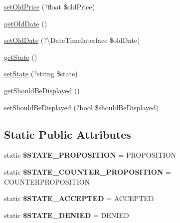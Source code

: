 \begin{DoxyCompactItemize}
\item 
\mbox{\hyperlink{class_app_1_1_entity_1_1_proposition_a6d13c98cd930f18428bd23fdd7ed0830}{set\+Old\+Price}} (?float \$old\+Price)
\item 
\mbox{\hyperlink{class_app_1_1_entity_1_1_proposition_ac7965e177345d55c4a73d4fc25014209}{get\+Old\+Date}} ()
\item 
\mbox{\hyperlink{class_app_1_1_entity_1_1_proposition_ac9048be57b5a9e5419ff789ebc2d9137}{set\+Old\+Date}} (?\textbackslash{}Date\+Time\+Interface \$old\+Date)
\item 
\mbox{\hyperlink{class_app_1_1_entity_1_1_proposition_afbf787ced76807989fb3093e1772c5a1}{get\+State}} ()
\item 
\mbox{\hyperlink{class_app_1_1_entity_1_1_proposition_ad77046fc7af023c04e134c61acbeea3d}{set\+State}} (?string \$state)
\item 
\mbox{\hyperlink{class_app_1_1_entity_1_1_proposition_a4198174caeb3623ce73f2bf9c226013f}{get\+Should\+Be\+Displayed}} ()
\item 
\mbox{\hyperlink{class_app_1_1_entity_1_1_proposition_a322db8bcef4e74e4f9b4ef1b87686446}{set\+Should\+Be\+Displayed}} (?bool \$should\+Be\+Displayed)
\end{DoxyCompactItemize}
\subsection*{Static Public Attributes}
\begin{DoxyCompactItemize}
\item 
\mbox{\label{class_app_1_1_entity_1_1_proposition_aa962ea0dd50344eaededb7f740353a88}} 
static {\bfseries \$\+S\+T\+A\+T\+E\+\_\+\+P\+R\+O\+P\+O\+S\+I\+T\+I\+ON} = \textquotesingle{}P\+R\+O\+P\+O\+S\+I\+T\+I\+ON\textquotesingle{}
\item 
\mbox{\label{class_app_1_1_entity_1_1_proposition_a6621475dd7d7806d83fe21b480c37242}} 
static {\bfseries \$\+S\+T\+A\+T\+E\+\_\+\+C\+O\+U\+N\+T\+E\+R\+\_\+\+P\+R\+O\+P\+O\+S\+I\+T\+I\+ON} = \textquotesingle{}C\+O\+U\+N\+T\+E\+R\+P\+R\+O\+P\+O\+S\+I\+T\+I\+ON\textquotesingle{}
\item 
\mbox{\label{class_app_1_1_entity_1_1_proposition_a9fd691f8b40c9195dce006c8420f32c5}} 
static {\bfseries \$\+S\+T\+A\+T\+E\+\_\+\+A\+C\+C\+E\+P\+T\+ED} = \textquotesingle{}A\+C\+C\+E\+P\+T\+ED\textquotesingle{}
\item 
\mbox{\label{class_app_1_1_entity_1_1_proposition_a067d4bc8bf32a76d53ccca5496dbdae7}} 
static {\bfseries \$\+S\+T\+A\+T\+E\+\_\+\+D\+E\+N\+I\+ED} = \textquotesingle{}D\+E\+N\+I\+ED\textquotesingle{}
\end{DoxyCompactItemize}



